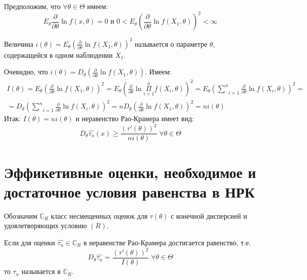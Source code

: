 Предположим, что $\forall \theta \in \Theta$ имеем:
$$E_{\theta} \frac{\partial}{\partial \theta} \ln f(x, \theta) = 0 \text{ и } 0 < E_{\theta} \left( \frac{\partial}{\partial \theta} \ln f(X_1, \theta) \right)^2 < \infty$$

\begin{definition}\label{lec:4/def:5}
	Величина $i(\theta) = E_{\theta} \left( \frac{\partial}{\partial \theta} \ln f(X_1, \theta) \right)^2$ называется  о параметре $\theta$, содержащейся в одном наблюдении $X_1$.
\end{definition}

Очевидно, что $\displaystyle i(\theta) = D_{\theta} \left( \frac{\partial}{\partial \theta} \ln f(X_1, \theta) \right)$. Имеем:
$$\begin{gathered}
	I(\theta) = E_{\theta} \left( \frac{\partial}{\partial \theta} \ln f(X_1, \theta) \right)^2 = E_{\theta} \left( \frac{\partial}{\partial \theta} \ln \underset{i=1}{\overset{n}{\Pi}}f(X_i, \theta) \right)^2 = E_{\theta} \left( \underset{i=1}{\overset{n}{\sum}}\frac{\partial}{\partial \theta} \ln f(X_i, \theta) \right)^2 = \\
	= D_{\theta} \left( \underset{i=1}{\overset{n}{\sum}}\frac{\partial}{\partial \theta} \ln f(X_i, \theta) \right)^2 = n D_{\theta} \left( \frac{\partial}{\partial \theta} \ln f(X_1, \theta) \right)^2 = n i(\theta)
\end{gathered}$$
Итак: $I(\theta) = n i(\theta)$ и неравенство Рао-Крамера имеет вид:
$$D_{\theta} \hat{\tau_n}(x) \ge \frac{\left( \tau'(\theta) \right)^2}{n i(\theta)} \; \forall \theta \in \Theta$$

\section{Эффикетивные оценки, необходимое и достаточное условия равенства в НРК}\label{lec:4/sec:3}

Обозначим $\mathbb{C}_R$ класс несмещенных оценок для $\tau(\theta)$ с конечной дисперсией и удовлетворяющих условию $(R)$.

\begin{definition}\label{lec:4/def:6}
	Если для оценки $\hat{\tau_n} \in \mathbb{C}_R$ в неравенстве Рао-Крамера достигается равенство, т.е.
	$$D_{\theta} \hat{\tau_n} = \frac{\left( \tau'(\theta) \right)^2}{I(\theta)} \; \forall \theta \in \Theta$$
	то $\hat{\tau_n}$ называется  в $\mathbb{C}_R$.
\end{definition}

